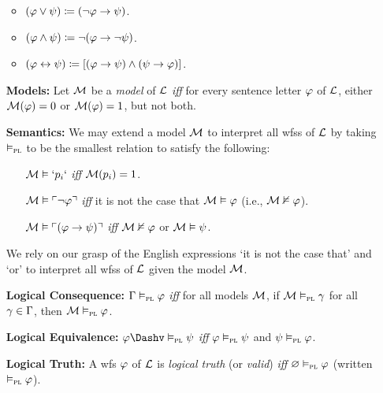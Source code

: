 \documentclass[a4paper, 11pt]{article} %
\begin{document}
\begin{enumerate}[leftmargin=1.2in,labelsep=.15in]
\begin{itemize}
      \item $(\varphi \vee \psi) \coloneq (\neg \varphi \rightarrow \psi)$.
      \item $(\varphi\wedge \psi) \coloneq \neg(\varphi \rightarrow \neg\psi)$.
      \item $(\varphi\leftrightarrow \psi) \coloneq [(\varphi\rightarrow \psi)\wedge(\psi\rightarrow \varphi)]$.
    \end{itemize}
  \item[\bf Models:] Let $\mathcal{M}$ be a \textit{model} of $\mathcal{L}$ \textit{iff} for every sentence letter $\varphi$ of $\mathcal{L}$, either $\mathcal{M}(\varphi)=0$ or $\mathcal{M}(\varphi)=1$, but not both.
  \item[\bf Semantics:] We may extend a model $\mathcal{M}$ to interpret all wfss of $\mathcal{L}$ by taking $\vDash_{\textsc{pl}}$ to be the smallest relation to satisfy the following:
  \begin{itemize}[leftmargin=.15in]\small
  \item[] $\mathcal{M}\vDash `p_i`$ \textit{iff} $\mathcal{M}(p_i)=1$.
  \item[] $\mathcal{M}\vDash \ulcorner\neg \varphi\urcorner$ \textit{iff} it is not the case that $\mathcal{M}\vDash \varphi$ (i.e., $\mathcal{M}\nvDash \varphi$). %
  \item[] $\mathcal{M}\vDash \ulcorner(\varphi \rightarrow \psi)\urcorner$ \textit{iff} $\mathcal{M}\nvDash \varphi$ or $\mathcal{M}\vDash \psi$.
  \end{itemize}
  We rely on our grasp of the English expressions `it is not the case that' and `or' to interpret all wfss of $\mathcal{L}$ given the model $\mathcal{M}$. 
  \item[\bf Logical Consequence:] $\Gamma \vDash_{\textsc{pl}} \varphi$ \textit{iff} for all models $\mathcal{M}$, if $\mathcal{M}\vDash_{\textsc{pl}} \gamma$ for all $\gamma\in\Gamma$, then $\mathcal{M}\vDash_{\textsc{pl}} \varphi$.
  \item[\bf Logical Equivalence:] $\metaA \Dashv\PLmodels \metaB$ \textit{iff} $\varphi\vDash_{\textsc{pl}} \psi$ and $\psi\vDash_{\textsc{pl}} \varphi$.  
  \item[\bf Logical Truth:] A wfs $\varphi$ of $\mathcal{L}$ is \textit{logical truth} (or \textit{valid}) \textit{iff} $\varnothing\vDash_{\textsc{pl}} \varphi$ (written $\vDash_{\textsc{pl}} \varphi$).
\end{enumerate}
\end{document}
